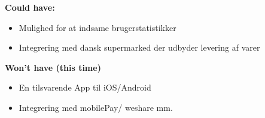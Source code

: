 \noindent \textbf{Could have:}

\begin{itemize}
    \item Mulighed for at indsame brugerstatistikker
    \item Integrering med dansk supermarked der udbyder levering af varer
\end{itemize}

\noindent \textbf{Won't have (this time)}
\begin{itemize}
    \item En tilsvarende App til iOS/Android
    \item Integrering med mobilePay/ weshare mm.
\end{itemize}


